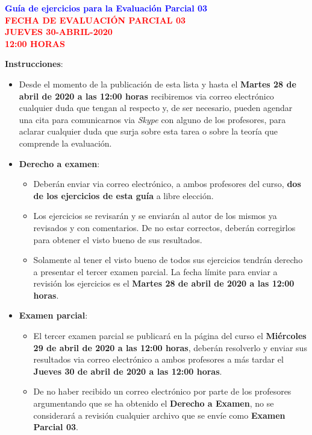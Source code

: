 \documentclass[10pt]{report}
\numberwithin{section}{chapter}
\begin{document}
\begin{center}
\textcolor{blue}{\textbf{\large Guía de ejercicios para la Evaluación Parcial 03}}\\
\vspace{0.5 cm}
\textcolor{red}{\textbf{\large FECHA DE EVALUACIÓN PARCIAL 03 \\ JUEVES 30-ABRIL-2020\\ 12:00 HORAS}}
\end{center}

\textbf{Instrucciones}: 
\begin{itemize}
\item Desde el momento de la publicación de esta lista y hasta el \textbf{Martes 28 de abril de 2020 a las 12:00 horas} recibiremos via correo electrónico cualquier duda que tengan al respecto y, de ser necesario, pueden agendar una cita para comunicarnos via {\it Skype} con alguno de los profesores, para aclarar cualquier duda que surja sobre esta tarea o sobre la teoría que comprende la evaluación.

\item \textbf{Derecho a examen}:
\begin{itemize}
\item Deberán enviar via correo electrónico, a ambos profesores del curso, \textbf{dos de los ejercicios de esta guía} a libre elección.

\item Los ejercicios se revisarán y se enviarán al autor de los mismos ya revisados y con comentarios. De no estar correctos, deberán corregirlos para obtener el visto bueno de sus resultados.

\item Solamente al tener el visto bueno de todos sus ejercicios tendrán derecho a presentar el tercer examen parcial. La fecha límite para enviar a revisión los ejercicios es el \textbf{Martes 28 de abril de 2020 a las 12:00 horas}.
\end{itemize}

\item \textbf{Examen parcial}:
\begin{itemize}
\item El tercer examen parcial se publicará en la página del curso el \textbf{Miércoles 29 de abril de 2020 a las 12:00 horas}, deberán resolverlo y enviar sus resultados via correo electrónico a ambos profesores a más tardar el \textbf{Jueves 30 de abril de 2020 a las 12:00 horas}.

\item De no haber recibido un correo electrónico por parte de los profesores argumentando que se ha obtenido el \textbf{Derecho a Examen}, no se considerará a revisión cualquier archivo que se envíe como \textbf{Examen Parcial 03}.
\end{itemize}
\end{itemize}
\end{document}
